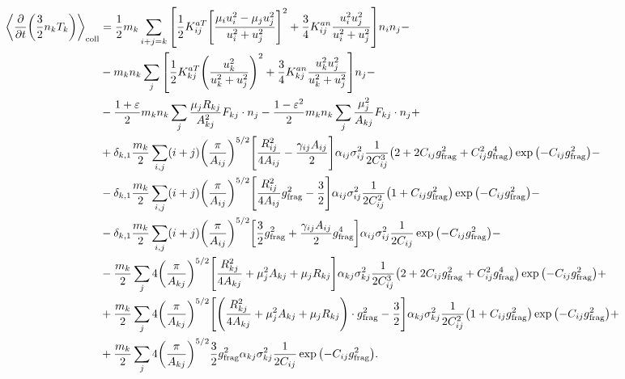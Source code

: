 \documentclass[aps,prl,preprint,groupedaddress,10pt]{revtex4-2}
\begin{document}
\begin{equation}
    \begin{split}
        \ltx{\avg{\pdv{t}\pqty{\frac{3}{2}n_kT_k}}}{coll}&=\frac{1}{2}m_k\sum_{i+j=k}
        \bqty{\frac{1}{2}K^{aT}_{ij}\bqty{\frac{\mu_iu_i^2-\mu_ju_j^2}{u_i^2+u_j^2}}^2+
        \frac{3}{4}K^{an}_{ij}\frac{u_i^2u_j^2}{u_i^2+u_j^2}}n_in_j-\\
        &-m_kn_k\sum_{j}\bqty{\frac{1}{2}K^{aT}_{kj}\pqty{\frac{u_{k}^2}{u_{k}^2+u_{j}^2}}^2+
        \frac{3}{4}K^{an}_{kj}\frac{u_k^2u_j^2}{u_k^2+u_j^2}}n_j-\\
        &-\frac{1+\eps}{2}m_kn_k
        \sum_{j}\frac{\mu_jR_{kj}}{A_{kj}^2}F_{kj}\cdot n_j-
        \frac{1-\eps^2}{2}m_kn_k\sum_{j}\frac{\mu_j^2}{A_{kj}}F_{kj}\cdot n_j+\\
        &+\delta_{k,1}\frac{m_k}{2}
        \sum_{i,j}(i+j)\pqty{\frac{\pi}{A_{ij}}}^{5/2}
        \bqty{\frac{R_{ij}^2}{4A_{ij}}-\frac{\gamma_{ij}A_{ij}}{2}}
        \alpha_{ij}\sigma_{ij}^2\frac{1}{2C_{ij}^3}\pqty{2+2C_{ij}\ltx{g}{frag}^2+C_{ij}^2
        \ltx{g}{frag}^4}\exp\pqty{-C_{ij}\ltx{g}{frag}^2}-\\
        &-\delta_{k,1}\frac{m_k}{2}
        \sum_{i,j}(i+j)\pqty{\frac{\pi}{A_{ij}}}^{5/2}
        \bqty{\frac{R_{ij}^2}{4A_{ij}}\ltx{g}{frag}^2-\frac{3}{2}}
        \alpha_{ij}\sigma_{ij}^2\frac{1}{2C_{ij}^2}\pqty{1+C_{ij}\ltx{g}{frag}^2}
        \exp\pqty{-C_{ij}\ltx{g}{frag}^2}-\\
        &-\delta_{k,1}\frac{m_k}{2}
        \sum_{i,j}(i+j)\pqty{\frac{\pi}{A_{ij}}}^{5/2}
        \bqty{\frac{3}{2}\ltx{g}{frag}^2+\frac{\gamma_{ij}A_{ij}}{2}\ltx{g}{frag}^4}
        \alpha_{ij}\sigma_{ij}^2\frac{1}{2C_{ij}}\exp\pqty{-C_{ij}\ltx{g}{frag}^2}-\\
        &-\frac{m_k}{2}\sum_{j}4\pqty{\frac{\pi}{A_{kj}}}^{5/2}
        \bqty{\frac{R_{kj}^2}{4A_{kj}}+\mu_j^2A_{kj}+\mu_jR_{kj}}
        \alpha_{kj}\sigma_{kj}^2
        \frac{1}{2C_{ij}^3}\pqty{2+2C_{ij}\ltx{g}{frag}^2+C_{ij}^2\ltx{g}{frag}^4}
        \exp\pqty{-C_{ij}\ltx{g}{frag}^2}+\\
        &+\frac{m_k}{2}\sum_{j}4\pqty{\frac{\pi}{A_{kj}}}^{5/2}
        \bqty{\pqty{\frac{R_{kj}^2}{4A_{kj}}+\mu_j^2A_{kj}+\mu_jR_{kj}}\cdot\ltx{g}{frag}^2
        -\frac{3}{2}}
        \alpha_{kj}\sigma_{kj}^2
        \frac{1}{2C_{ij}^2}\pqty{1+C_{ij}\ltx{g}{frag}^2}\exp\pqty{-C_{ij}\ltx{g}{frag}^2}+\\
        &+\frac{m_k}{2}\sum_{j}4\pqty{\frac{\pi}{A_{kj}}}^{5/2}
        \frac{3}{2}\ltx{g}{frag}^2\alpha_{kj}
        \sigma_{kj}^2\frac{1}{2C_{ij}}\exp\pqty{-C_{ij}\ltx{g}{frag}^2}.
    \end{split}
\end{equation}
\end{document}
